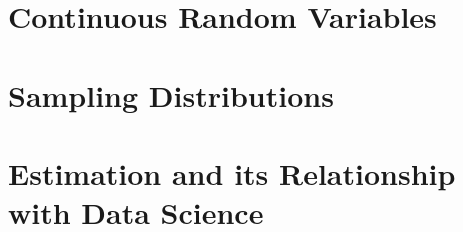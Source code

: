 \documentclass[xcolor={dvipsnames},justified]{tufte-book}
\begin{document}
\chapter{Continuous Random Variables}













\chapter{Sampling Distributions}



















\chapter{Estimation and its Relationship with Data Science}














\end{document}
